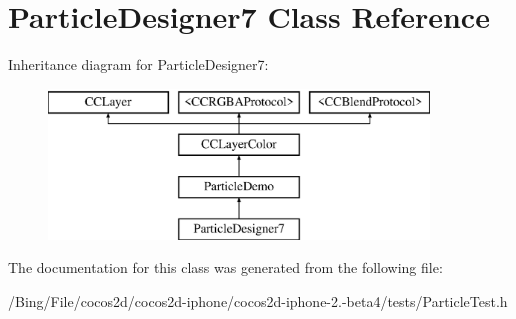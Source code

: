 \hypertarget{interface_particle_designer7}{\section{Particle\-Designer7 Class Reference}
\label{interface_particle_designer7}
}
Inheritance diagram for Particle\-Designer7\-:\begin{figure}[H]
\begin{center}
\leavevmode
\includegraphics[height=4.000000cm]{interface_particle_designer7}
\end{center}
\end{figure}


The documentation for this class was generated from the following file\-:\begin{DoxyCompactItemize}
\item 
/\-Bing/\-File/cocos2d/cocos2d-\/iphone/cocos2d-\/iphone-\/2.-\/beta4/tests/Particle\-Test.\-h\end{DoxyCompactItemize}
